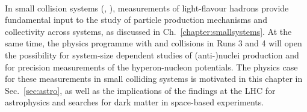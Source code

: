 \\\noindent In small collision systems (\pp, \pPb), measurements of light-flavour hadrons provide fundamental input to the study of particle production mechanisms and collectivity across systems, as discussed in Ch.~\ref{chapter:smallsystems}. At the same time, the physics programme with \pp and \pPb collisions in Runs 3 and 4 will open the possibility for system-size dependent studies of (anti-)nuclei production and for precision measurements of the hyperon-nucleon potentials. 
The physics case for these measurements in small colliding systems is motivated in this chapter in Sec.~\ref{sec:astro}, as well as the implications of the findings at the LHC for astrophysics and searches for dark matter in space-based experiments.

